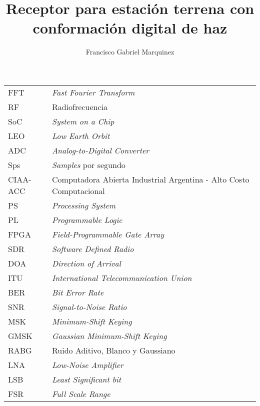 \documentclass[screen, pagebackref, oneside]{ibtesis}
\title{Receptor para estación terrena con conformación digital de haz}
\author{Francisco Gabriel Marquinez}
\begin{document}
\begin{preliminary}


    \begin{abreviaturas}
        \begin{table}[H]
            \begin{tabular}{ll}
            FFT &   \textit{Fast Fourier Transform} \\
            RF  &   Radiofrecuencia                 \\
            SoC &   \textit{System on a Chip}       \\
            LEO &   \textit{Low Earth Orbit}        \\
            ADC &   \textit{Analog-to-Digital Converter} \\
            Sps &   \textit{Samples} por segundo   \\
            CIAA-ACC & Computadora Abierta Industrial Argentina - Alto Costo
            Computacional  \\
            PS  &   \textit{Processing System}  \\
            PL  &   \textit{Programmable Logic} \\
            FPGA &  \textit{Field-Programmable Gate Array} \\
            SDR &   \textit{Software Defined Radio} \\
            DOA &   \textit{Direction of Arrival}   \\
            ITU &   \textit{International Telecommunication Union} \\
            BER &   \textit{Bit Error Rate} \\
            SNR &   \textit{Signal-to-Noise Ratio}  \\
            MSK &   \textit{Minimum-Shift Keying}  \\
            GMSK &  \textit{Gaussian Minimum-Shift Keying} \\
            RABG &  Ruido Aditivo, Blanco y Gaussiano   \\
            LNA &   \textit{Low-Noise Amplifier}    \\
            LSB &   \textit{Least Significant bit}  \\
            FSR &   \textit{Full Scale Range}
            \end{tabular}
        \end{table}    
    \end{abreviaturas}
    
    \tableofcontents                %
    \listoffigures                  %
    \listoftables                   %
    
    
\end{preliminary}
\end{document}
